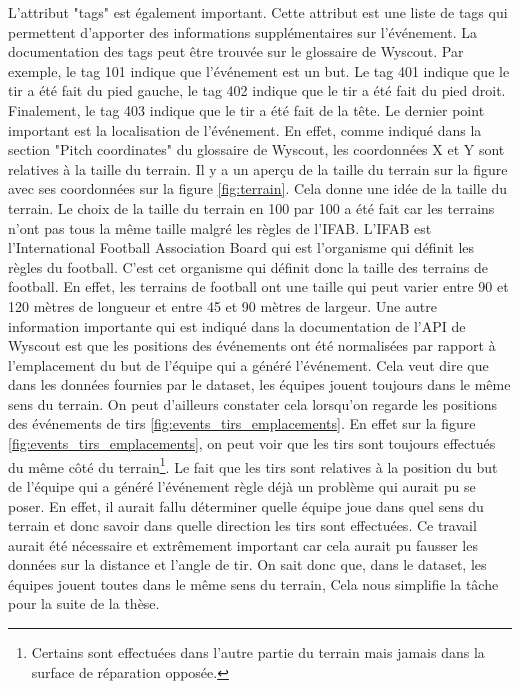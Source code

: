 \documentclass[12pt]{article}
\begin{document}
\noindent L'attribut "tags" est également important.
Cette attribut est une liste de tags qui permettent d'apporter des informations supplémentaires sur l'événement.
La documentation des tags peut être trouvée sur le glossaire de Wyscout. \cite{WyscoutGlossary}
Par exemple, le tag 101 indique que l'événement est un but. 
Le tag 401 indique que le tir a été fait du pied gauche, le tag 402 indique que le tir a été fait du pied droit.
Finalement, le tag 403 indique que le tir a été fait de la tête.
\newline\newline
Le dernier point important est la localisation de l'événement.
En effet, comme indiqué dans la section "Pitch coordinates" du glossaire de Wyscout, \cite{WyscoutGlossary} les coordonnées X et Y sont relatives à la taille du terrain.
Il y a un aperçu de la taille du terrain sur la figure avec ses coordonnées sur la figure \ref{fig:terrain}.
Cela donne une idée de la taille du terrain.
Le choix de la taille du terrain en 100 par 100 a été fait car les terrains n'ont pas tous la même taille malgré les règles de l'IFAB.
\newline\newline
L'IFAB est l'International Football Association Board qui est l'organisme qui définit les règles du football. 
C'est cet organisme qui définit donc la taille des terrains de football.
En effet, les terrains de football ont une taille qui peut varier entre 90 et 120 mètres de longueur et entre 45 et 90 mètres de largeur. \cite{TerrainIFAB}
\newline\newline 
Une autre information importante qui est indiqué dans la documentation de l'API de Wyscout \cite{WyscoutAPI} est que les positions des événements ont été normalisées par rapport à l'emplacement du but de l'équipe qui a généré l'événement.
Cela veut dire que dans les données fournies par le dataset, les équipes jouent toujours dans le même sens du terrain.
On peut d'ailleurs constater cela lorsqu'on regarde les positions des événements de tirs \ref{fig:events_tirs_emplacements}.
En effet sur la figure \ref{fig:events_tirs_emplacements}, on peut voir que les tirs sont toujours effectués du même côté du terrain\footnote{Certains sont effectuées dans l'autre partie du terrain mais jamais dans la surface de réparation opposée.}.
Le fait que les tirs sont relatives à la position du but de l'équipe qui a généré l'événement règle déjà un problème qui aurait pu se poser.
En effet, il aurait fallu déterminer quelle équipe joue dans quel sens du terrain et donc savoir dans quelle direction les tirs sont effectuées.
Ce travail aurait été nécessaire et extrêmement important car cela aurait pu fausser les données sur la distance et l'angle de tir.
\newline\newline
On sait donc que, dans le dataset, les équipes jouent toutes dans le même sens du terrain, Cela nous simplifie la tâche pour la suite de la thèse.
\end{document}
